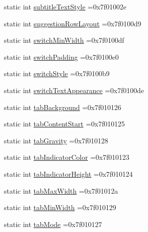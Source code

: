 \begin{DoxyCompactItemize}
\item 
static int \hyperlink{classandroid_1_1support_1_1v7_1_1cardview_1_1R_1_1attr_ab76882e8855338c32b6fe8ee7b986537}{subtitle\+Text\+Style} =0x7f01002e
\item 
static int \hyperlink{classandroid_1_1support_1_1v7_1_1cardview_1_1R_1_1attr_ac8f6b21ae8cc1f561a1b39681bf76d69}{suggestion\+Row\+Layout} =0x7f0100d9
\item 
static int \hyperlink{classandroid_1_1support_1_1v7_1_1cardview_1_1R_1_1attr_a708e67b59363818ee7852db665efd30d}{switch\+Min\+Width} =0x7f0100df
\item 
static int \hyperlink{classandroid_1_1support_1_1v7_1_1cardview_1_1R_1_1attr_a8b6e45488aae7078a0791f1fbe6229a1}{switch\+Padding} =0x7f0100e0
\item 
static int \hyperlink{classandroid_1_1support_1_1v7_1_1cardview_1_1R_1_1attr_aad5de7139ec7a0aaa9b3ff7a957f370e}{switch\+Style} =0x7f0100b9
\item 
static int \hyperlink{classandroid_1_1support_1_1v7_1_1cardview_1_1R_1_1attr_a98c4d99255d0d40a6124ad8dbac74bf1}{switch\+Text\+Appearance} =0x7f0100de
\item 
static int \hyperlink{classandroid_1_1support_1_1v7_1_1cardview_1_1R_1_1attr_afbb4b95c4751cc3b349627d941ac9d92}{tab\+Background} =0x7f010126
\item 
static int \hyperlink{classandroid_1_1support_1_1v7_1_1cardview_1_1R_1_1attr_aabbbb2a5e66b6f302100163d05d7e57f}{tab\+Content\+Start} =0x7f010125
\item 
static int \hyperlink{classandroid_1_1support_1_1v7_1_1cardview_1_1R_1_1attr_a33950a613ff954c84c39d6d194da00b2}{tab\+Gravity} =0x7f010128
\item 
static int \hyperlink{classandroid_1_1support_1_1v7_1_1cardview_1_1R_1_1attr_a127ad47732b6d288a076ced2aab96163}{tab\+Indicator\+Color} =0x7f010123
\item 
static int \hyperlink{classandroid_1_1support_1_1v7_1_1cardview_1_1R_1_1attr_a612178f5edffc144a50fc472aa0f2dfe}{tab\+Indicator\+Height} =0x7f010124
\item 
static int \hyperlink{classandroid_1_1support_1_1v7_1_1cardview_1_1R_1_1attr_a62bbe7ecd0c461ba4944a576d2ef8e66}{tab\+Max\+Width} =0x7f01012a
\item 
static int \hyperlink{classandroid_1_1support_1_1v7_1_1cardview_1_1R_1_1attr_a03ed2a5363c4bba9d9e149f556990a01}{tab\+Min\+Width} =0x7f010129
\item 
static int \hyperlink{classandroid_1_1support_1_1v7_1_1cardview_1_1R_1_1attr_a3c24a77c1c5e85a581ff4d14de5f5b4c}{tab\+Mode} =0x7f010127

\end{DoxyCompactItemize}
